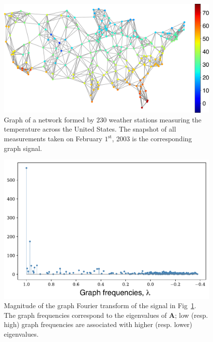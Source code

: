 \begin{figure}%
	\centering
\includegraphics[width=\linewidth]{Figures/GNorm_estacoes_temperatura.pdf}
	\caption{Graph of a network formed by $230$ weather stations measuring the temperature across the United States. The snapshot of all measurements taken on February $1^{\text{st}}$, 2003 is the corresponding graph signal.}%
	\label{fig:usa00}%
	\vspace{0.14cm}
\end{figure}

\begin{figure}[ht!]%
	\centering
\includegraphics[width=0.88\linewidth]{Figures/GNorm_estacoes_GFT_Temperatura.pdf}%
	\caption{Magnitude of the graph Fourier transform of the signal in Fig~\ref{fig:usa00}. The graph frequencies correspond to the eigenvalues of $\mathbf{A}$; low (resp. high) graph frequencies are associated with higher (resp. lower) eigenvalues.}%
	\label{fig:usa01}%
\end{figure}

